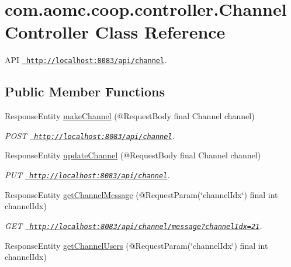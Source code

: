 \hypertarget{classcom_1_1aomc_1_1coop_1_1controller_1_1_channel_controller}{}\section{com.\+aomc.\+coop.\+controller.\+Channel\+Controller Class Reference}
\label{classcom_1_1aomc_1_1coop_1_1controller_1_1_channel_controller}


A\+PI \href{http://localhost:8083/api/channel}{\texttt{ http\+://localhost\+:8083/api/channel}}.  


\subsection*{Public Member Functions}
\begin{DoxyCompactItemize}
\item 
Response\+Entity \mbox{\hyperlink{classcom_1_1aomc_1_1coop_1_1controller_1_1_channel_controller_a6eec06a26ab08812025e22eb5e8005a9}{make\+Channel}} (@Request\+Body final Channel channel)
\begin{DoxyCompactList}\small\item\em P\+O\+ST \href{http://localhost:8083/api/channel}{\texttt{ http\+://localhost\+:8083/api/channel}}. \end{DoxyCompactList}\item 
Response\+Entity \mbox{\hyperlink{classcom_1_1aomc_1_1coop_1_1controller_1_1_channel_controller_adbe3375ab0a4097aa0dd80ff02a19690}{update\+Channel}} (@Request\+Body final Channel channel)
\begin{DoxyCompactList}\small\item\em P\+UT \href{http://localhost:8083/api/channel}{\texttt{ http\+://localhost\+:8083/api/channel}}. \end{DoxyCompactList}\item 
Response\+Entity \mbox{\hyperlink{classcom_1_1aomc_1_1coop_1_1controller_1_1_channel_controller_a536772003bd832f07fbbf36d4ee20a33}{get\+Channel\+Message}} (@Request\+Param(\char`\"{}channel\+Idx\char`\"{}) final int channel\+Idx)
\begin{DoxyCompactList}\small\item\em G\+ET \href{http://localhost:8083/api/channel/message?channelIdx=21}{\texttt{ http\+://localhost\+:8083/api/channel/message?channel\+Idx=21}}. \end{DoxyCompactList}\item 
Response\+Entity \mbox{\hyperlink{classcom_1_1aomc_1_1coop_1_1controller_1_1_channel_controller_afd9fae1d2ded0204fa895480dc8ce9b2}{get\+Channel\+Users}} (@Request\+Param(\char`\"{}channel\+Idx\char`\"{}) final int channel\+Idx)

\end{DoxyCompactItemize}
